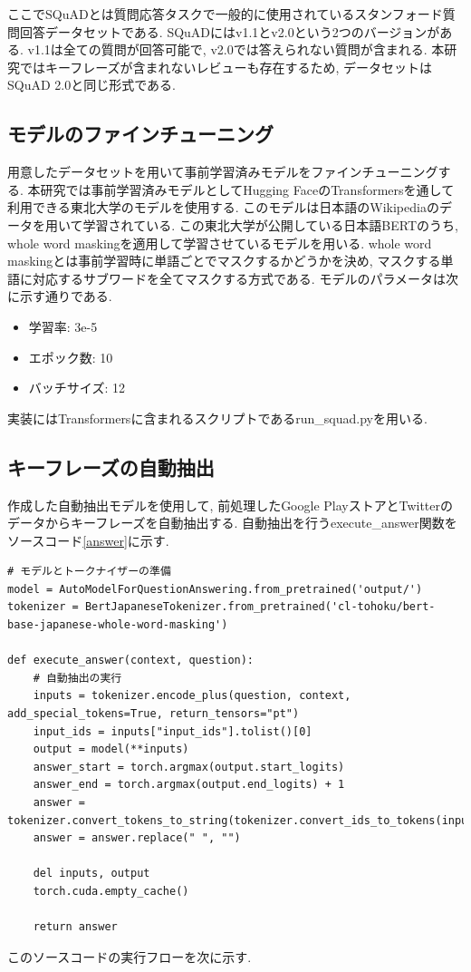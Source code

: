 ここでSQuADとは質問応答タスクで一般的に使用されているスタンフォード質問回答データセットである. 
SQuADにはv1.1とv2.0という2つのバージョンがある. v1.1は全ての質問が回答可能で, v2.0では答えられない質問が含まれる. 本研究ではキーフレーズが含まれないレビューも存在するため, データセットはSQuAD 2.0と同じ形式である. 

\subsection{モデルのファインチューニング}
用意したデータセットを用いて事前学習済みモデルをファインチューニングする. 本研究では事前学習済みモデルとしてHugging FaceのTransformersを通して利用できる東北大学のモデル\cite{tohoku}を使用する. このモデルは日本語のWikipediaのデータを用いて学習されている\cite{tohoku}. 
この東北大学が公開している日本語BERTのうち, whole word maskingを適用して学習させているモデル\cite{masking}を用いる. whole word maskingとは事前学習時に単語ごとでマスクするかどうかを決め, マスクする単語に対応するサブワードを全てマスクする方式である. モデルのパラメータは次に示す通りである. 
\begin{itemize}
  \item 学習率: 3e-5
  \item エポック数: 10
  \item バッチサイズ: 12
\end{itemize}
実装にはTransformersに含まれるスクリプトであるrun\_squad.pyを用いる. 

\subsection{キーフレーズの自動抽出}
作成した自動抽出モデルを使用して, 前処理したGoogle PlayストアとTwitterのデータからキーフレーズを自動抽出する. 自動抽出を行うexecute\_answer関数をソースコード\ref{answer}に示す. 
\begin{lstlisting}[caption=execute\_answer関数,label=answer]
# モデルとトークナイザーの準備
model = AutoModelForQuestionAnswering.from_pretrained('output/')  
tokenizer = BertJapaneseTokenizer.from_pretrained('cl-tohoku/bert-base-japanese-whole-word-masking') 

def execute_answer(context, question):
    # 自動抽出の実行
    inputs = tokenizer.encode_plus(question, context, add_special_tokens=True, return_tensors="pt")
    input_ids = inputs["input_ids"].tolist()[0]
    output = model(**inputs)
    answer_start = torch.argmax(output.start_logits)  
    answer_end = torch.argmax(output.end_logits) + 1 
    answer = tokenizer.convert_tokens_to_string(tokenizer.convert_ids_to_tokens(input_ids[answer_start:answer_end]))
    answer = answer.replace(" ", "")

    del inputs, output
    torch.cuda.empty_cache()

    return answer
\end{lstlisting}
このソースコードの実行フローを次に示す.  

